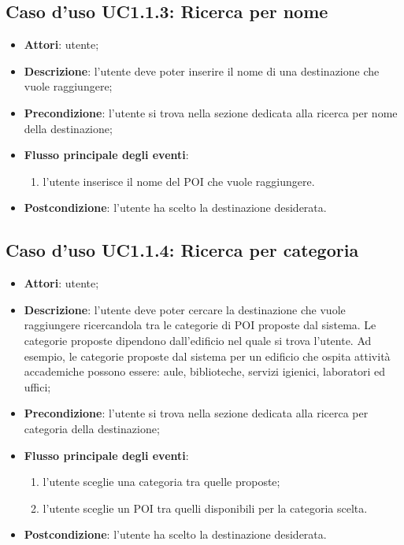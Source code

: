 \documentclass[../AnalisiDeiRequisiti.tex]{subfiles}
\begin{document}
\subsection{Caso d'uso UC1.1.3: Ricerca per nome}
\begin{itemize}
	\item \textbf{Attori}: utente;
	\item \textbf{Descrizione}: l'utente deve poter inserire il nome di una destinazione che vuole raggiungere; 
	\item \textbf{Precondizione}: l'utente si trova nella sezione dedicata alla ricerca per nome della destinazione;
	
	\item \textbf{Flusso principale degli eventi}:
	\begin{enumerate}
		\item l'utente inserisce il nome del POI che vuole raggiungere.
		
	\end{enumerate}
	\item \textbf{Postcondizione}: l'utente ha scelto la destinazione desiderata.
\end{itemize}
\hypertarget{UC1.1.4}{}
\subsection{Caso d'uso UC1.1.4: Ricerca per categoria}
\begin{itemize}
	\item \textbf{Attori}: utente;
	\item \textbf{Descrizione}: l'utente deve poter cercare la destinazione che vuole raggiungere ricercandola tra le categorie di POI proposte dal sistema. Le categorie proposte dipendono dall'edificio nel quale si trova l'utente. Ad esempio, le categorie proposte dal sistema per un edificio che ospita attività accademiche possono essere: aule, biblioteche, servizi igienici, laboratori ed uffici; 
	\item \textbf{Precondizione}: l'utente si trova nella sezione dedicata alla ricerca per categoria della destinazione;
	
	\item \textbf{Flusso principale degli eventi}:
	\begin{enumerate}
		\item l'utente sceglie una categoria tra quelle proposte;
		\item l'utente sceglie un POI tra quelli disponibili per la categoria scelta.
		
	\end{enumerate}
	\item \textbf{Postcondizione}: l'utente ha scelto la destinazione desiderata.
\end{itemize}
\hypertarget{UC1.1.5}{}
\end{document}
